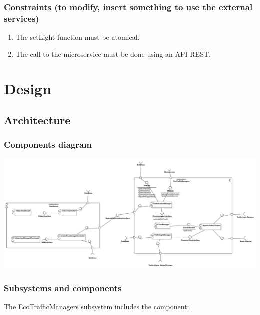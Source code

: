 \documentclass[12pt, a4paper, twoside, openright]{report}
\begin{document}
\subsection{Constraints (to modify, insert something to use the
external services)}

\begin{enumerate}
\item
  The setLight function must be atomical.
\item
  The call to the microservice must be done using an API REST.
\end{enumerate}

\chapter{Design}

\section{Architecture}
\subsection{Components diagram}

\includegraphics[width=\linewidth]{images/svg/ComponentDiagram.pdf}

\subsection{Subsystems and components}

The EcoTrafficManagers subsystem includes the component:
\end{document}

